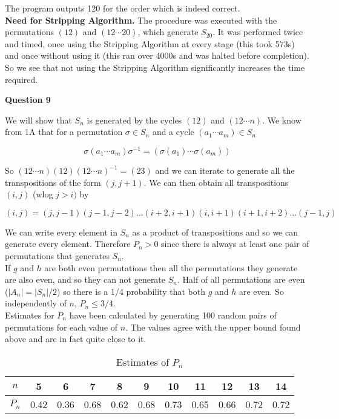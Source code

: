 \documentclass[12pt]{extarticle}
\begin{document}
The program outputs 120 for the order which is indeed correct. \\

\textbf{Need for Stripping Algorithm.} The procedure was executed with the permutations $(12)$ and $(12\dotsm 20)$, which generate $S_{20}$. It was performed twice and timed, once using the Stripping Algorithm at every stage (this took 573s) and once without using it (this ran over 4000s and was halted before completion). So we see that not using the Stripping Algorithm significantly increases the time required. 

\begin{center}
\textbf{Question 9}
\end{center}

We will show that $S_n$ is generated by the cycles $(12)$ and $(12\dotsm n)$. We know from 1A that for a permutation $\sigma \in S_n$ and a cycle $(a_1 \dotsm a_m) \in S_n$

$$\sigma (a_1 \dotsm a_m)\sigma^{-1} = (\sigma(a_1)\dotsm \sigma(a_m))$$

So $(12\dotsm n)(12)(12\dotsm n)^{-1} = (23)$ and we can iterate to generate all the transpositions of the form $(j,j+1)$. We can then obtain all transpositions $(i,j)$ (wlog $j > i)$ by 

$$(i,j) = (j,j-1)(j-1,j-2)\dots (i+2,i+1)(i,i+1)(i+1,i+2)\dots (j-1,j)$$

We can write every element in $S_n$ as a product of transpositions and so we can generate every element. Therefore $P_n > 0$ since there is always at least one pair of permutations that generates $S_n$.\\

If $g$ and $h$ are both even permutations then all the permutations they generate are also even, and so they can not generate $S_n$. Half of all permutations are even ($|A_n| = |S_n|/2$) so there is a 1/4 probability that both $g$ and $h$ are even. So independently of $n$, $P_n \leq 3/4$.\\

Estimates for $P_n$ have been calculated by generating 100 random pairs of permutations for each value of $n$. The values agree with the upper bound found above and are in fact quite close to it. 

\begin{table}[!htbp]
\centering
\begin{tabular}{|c|cccccccccc|}
\hline
\multirow{1}{1.5em}{$n$} & 5 & 6 & 7 & 8 & 9 & 10 & 11 &12 &13 & 14\\
\hline
\multirow{1}{1.5em}{$P_n$} & 0.42 & 0.36 & 0.68 & 0.62 & 0.68 & 0.73 & 0.65 & 0.66& 0.72 & 0.72\\
\hline
\end{tabular}
\caption{Estimates of $P_n$}
\label{Table:2}
\end{table}
\end{document}
